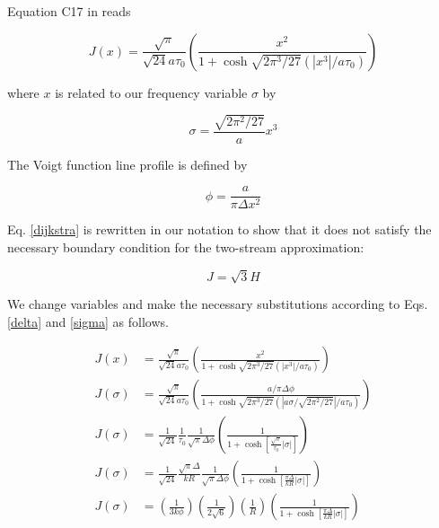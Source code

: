 \documentclass[onecolumn]{aastex63}
\begin{document}
Equation C17 in \citet{2006ApJ...649...14D} reads

\begin{equation} \label{dijkstra}
    J(x) = \frac{\sqrt{\pi}}{\sqrt{24}a\tau_0}\left(\frac{x^2}{1 + \cosh{\sqrt{2\pi^3/27}(|x^3|/a\tau_0)}}\right)
\end{equation}

where $x$ is related to our frequency variable $\sigma$ by 

\begin{equation} \label{sigma}
    \sigma = \frac{\sqrt{2\pi^2/27}}{a} x^3
\end{equation}

The Voigt function line profile is defined by

\begin{equation} \label{lineprofile}
    \phi = \frac{a}{\pi\Delta x^2}
\end{equation}

Eq. \ref{dijkstra} is rewritten in our notation to show that it does not satisfy the necessary boundary condition for the two-stream approximation:

\begin{equation}
    J = \sqrt{3} H
\end{equation}

We change variables and make the necessary substitutions according to Eqs. \ref{delta} and \ref{sigma} as follows.

\begin{equation}
\begin{split}
    J(x) &= \frac{\sqrt{\pi}}{\sqrt{24}a\tau_0}\left(\frac{x^2}{1 + \cosh{\sqrt{2\pi^3/27}(|x^3|/a\tau_0)}}\right)\\
    J(\sigma) &= \frac{\sqrt{\pi}}{\sqrt{24}a\tau_0}\left(\frac{a/\pi \Delta \phi}{1 + \cosh{\sqrt{2\pi^3/27}(|a \sigma / \sqrt{2\pi^2/27}|/a\tau_0)}}\right)\\
    J(\sigma) &= \frac{1}{\sqrt{24}}\frac{1}{\tau_0}\frac{1}{\sqrt{\pi}\Delta \phi}\left(\frac{1}{1 + \cosh{\left[\frac{\sqrt{\pi}}{\tau_0}|\sigma|\right]}}\right)\\
    J(\sigma) &=
    \frac{1}{\sqrt{24}}\frac{\sqrt{\pi} \Delta}{kR}\frac{1}{\sqrt{\pi}\Delta \phi}\left(\frac{1}{1 + \cosh{\left[\frac{\pi \Delta}{kR}|\sigma|\right]}}\right)\\
    J(\sigma) &=
    \left(\frac{1}{3k\phi}\right) \left(\frac{1}{2\sqrt{6}}\right)\left(\frac{1}{R}\right)\left(\frac{1}{1 + \cosh{\left[\frac{\pi \Delta}{kR}|\sigma|\right]}}\right)\\
\end{split}
\end{equation}
\end{document}
